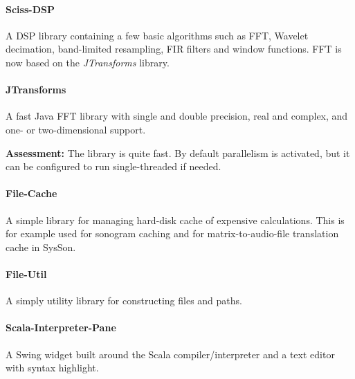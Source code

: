\documentclass[11pt,a4paper]{article}
\newcommand{\software}[1]{\textit{#1}}
\newcommand{\sysson}[0]{SysSon}
\begin{document}
\paragraph{Sciss-DSP}

A DSP library containing a few basic algorithms such as FFT, Wavelet decimation, band-limited resampling, FIR filters and window functions. FFT is now based on the \software{JTransforms} library.

\paragraph{JTransforms}

A fast Java FFT library with single and double precision, real and complex, and one- or two-dimensional support.

\textbf{Assessment:} The library is quite fast. By default parallelism is activated, but it can be configured to run single-threaded if needed.

\paragraph{File-Cache}

A simple library for managing hard-disk cache of expensive calculations. This is for example used for sonogram caching and for matrix-to-audio-file translation cache in \sysson{}. 

\paragraph{File-Util}

A simply utility library for constructing files and paths.

\paragraph{Scala-Interpreter-Pane}

A Swing widget built around the Scala compiler/interpreter and a text editor with syntax highlight.
\end{document}
